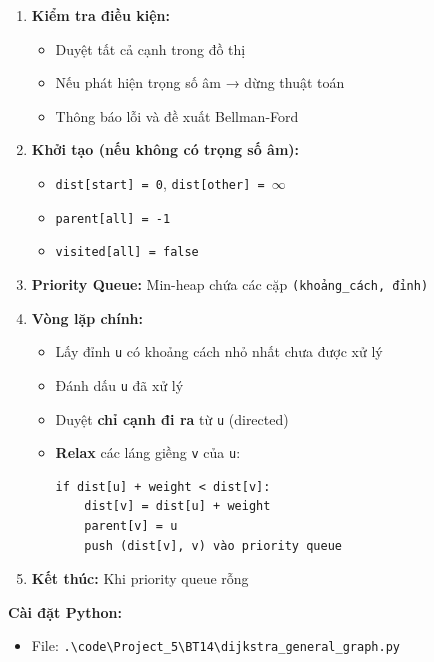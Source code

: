 \documentclass[12pt,a4paper]{article}
\begin{document}
\begin{enumerate}
    \item \textbf{Kiểm tra điều kiện:}
    \begin{itemize}[label=\textbullet]
        \item Duyệt tất cả cạnh trong đồ thị
        \item Nếu phát hiện trọng số âm → dừng thuật toán
        \item Thông báo lỗi và đề xuất Bellman-Ford
    \end{itemize}

    \item \textbf{Khởi tạo (nếu không có trọng số âm):}
    \begin{itemize}[label=\textbullet]
        \item \texttt{dist[start] = 0}, \texttt{dist[other] = $\infty$}
        \item \texttt{parent[all] = -1}
        \item \texttt{visited[all] = false}
    \end{itemize}

    \item \textbf{Priority Queue:} Min-heap chứa các cặp \texttt{(khoảng\_cách, đỉnh)}

    \item \textbf{Vòng lặp chính:}
    \begin{itemize}[label=\textbullet]
        \item Lấy đỉnh \texttt{u} có khoảng cách nhỏ nhất chưa được xử lý
        \item Đánh dấu \texttt{u} đã xử lý
        \item Duyệt \textbf{chỉ cạnh đi ra} từ \texttt{u} (directed)
        \item \textbf{Relax} các láng giềng \texttt{v} của \texttt{u}:
        \begin{verbatim}
if dist[u] + weight < dist[v]:
    dist[v] = dist[u] + weight
    parent[v] = u
    push (dist[v], v) vào priority queue
        \end{verbatim}
    \end{itemize}

    \item \textbf{Kết thúc:} Khi priority queue rỗng
\end{enumerate}

\textbf{Cài đặt Python:}
\begin{itemize}[label=\textbullet]
   \item File: \texttt{.\textbackslash code\textbackslash Project\_5\textbackslash BT14\textbackslash dijkstra\_general\_graph.py}
\end{itemize}
\end{document}

